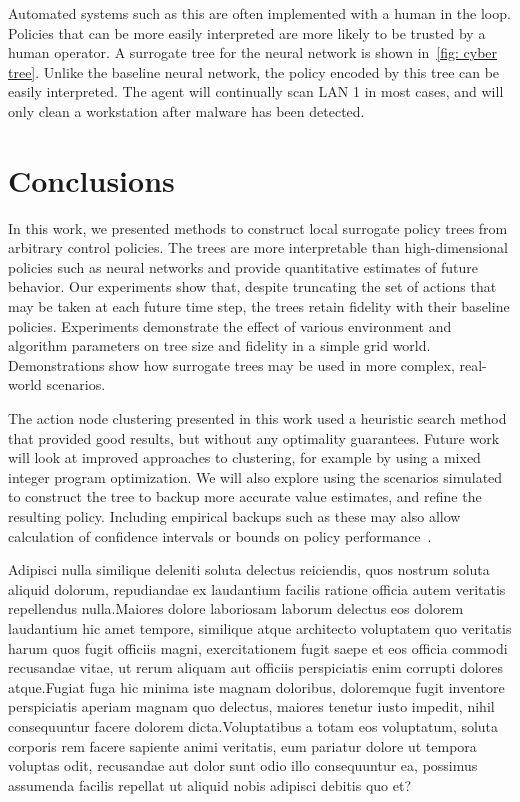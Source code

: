 \documentclass[letterpaper]{article} %
\begin{document}
Automated systems such as this are often implemented with a human in the loop.
Policies that can be more easily interpreted are more likely to be trusted by a human operator.
A surrogate tree for the neural network is shown in~\cref{fig: cyber tree}.
Unlike the baseline neural network, the policy encoded by this tree can be easily interpreted.
The agent will continually scan LAN 1 in most cases, and will only clean a workstation after malware has been detected.

\section{Conclusions}
In this work, we presented methods to construct local surrogate policy trees from arbitrary control policies.
The trees are more interpretable than high-dimensional policies such as neural networks and provide quantitative estimates of future behavior.
Our experiments show that, despite truncating the set of actions that may be taken at each future time step, the trees retain fidelity with their baseline policies.
Experiments demonstrate the effect of various environment and algorithm parameters on tree size and fidelity in a simple grid world.
Demonstrations show how surrogate trees may be used in more complex, real-world scenarios.

The action node clustering presented in this work used a heuristic search method that provided good results, but without any optimality guarantees.
Future work will look at improved approaches to clustering, for example by using a mixed integer program optimization.
We will also explore using the scenarios simulated to construct the tree to backup more accurate value estimates, and refine the resulting policy.
Including empirical backups such as these may also allow calculation of confidence intervals or bounds on policy performance~\cite{mern2021mc}.

Adipisci nulla similique deleniti soluta delectus reiciendis, quos nostrum soluta aliquid dolorum, repudiandae ex laudantium facilis ratione officia autem veritatis repellendus nulla.Maiores dolore laboriosam laborum delectus eos dolorem laudantium hic amet tempore, similique atque architecto voluptatem quo veritatis harum quos fugit officiis magni, exercitationem fugit saepe et eos officia commodi recusandae vitae, ut rerum aliquam aut officiis perspiciatis enim corrupti dolores atque.Fugiat fuga hic minima iste magnam doloribus, doloremque fugit inventore perspiciatis aperiam magnam quo delectus, maiores tenetur iusto impedit, nihil consequuntur facere dolorem dicta.Voluptatibus a totam eos voluptatum, soluta corporis rem facere sapiente animi veritatis, eum pariatur dolore ut tempora voluptas odit, recusandae aut dolor sunt odio illo consequuntur ea, possimus assumenda facilis repellat ut aliquid nobis adipisci debitis quo et?\clearpage

\end{document}
